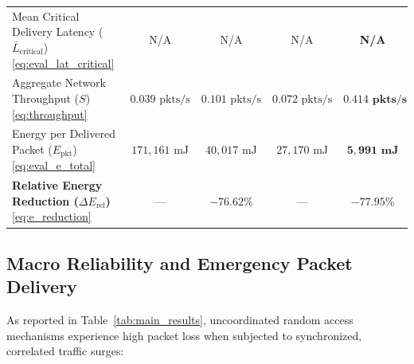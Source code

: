 \documentclass[preprint,review,12pt]{elsarticle}
\begin{document}
\begin{table}[!htb]
{\begin{tabular}{lcccc}
Mean Critical Delivery Latency ($\bar{L}_{\text{critical}}$) \eqref{eq:eval_lat_critical} & N/A & N/A & N/A & \textbf{N/A} \\
Aggregate Network Throughput ($S$) \eqref{eq:throughput} & $0.039\text{ pkts/s}$ & $0.101\text{ pkts/s}$ & $0.072\text{ pkts/s}$ & $\mathbf{0.414\text{ pkts/s}}$ \\
Energy per Delivered Packet ($E_{\text{pkt}}$) \eqref{eq:eval_e_total} & $171,161\text{ mJ}$ & $40,017\text{ mJ}$ & $27,170\text{ mJ}$ & $\mathbf{5,991\text{ mJ}}$ \\
\textbf{Relative Energy Reduction ($\Delta E_{\text{rel}}$)} \eqref{eq:e_reduction} & --- & $-76.62\%$ & --- & $\mathbf{-77.95\%}$ \\
\bottomrule
\end{tabular}}
\end{table}

\subsection{Macro Reliability and Emergency Packet Delivery}
\label{sec:results_reliability}

As reported in Table~\ref{tab:main_results}, uncoordinated random access mechanisms experience high packet loss when subjected to synchronized, correlated traffic surges:
\end{document}
